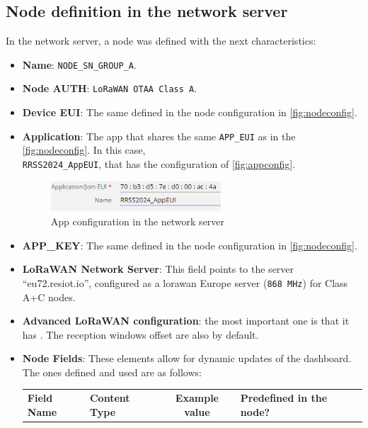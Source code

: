 \subsection{Node definition in the network server}

In the network server, a node was defined with the next characteristics:
\begin{itemize}
    \item \textbf{Name}: \texttt{NODE\_SN\_GROUP\_A}.
    \item \textbf{Node AUTH}: \texttt{LoRaWAN OTAA Class A}.
    \item \textbf{Device EUI}: The same defined in the node configuration in \autoref{fig:nodeconfig}.
    \item \textbf{Application}: The app that shares the same \texttt{APP\_EUI} as in the \autoref{fig:nodeconfig}. In this case, \\ \texttt{RRSS2024\_AppEUI}, that has the configuration of \autoref{fig:appconfig}.
    \begin{figure}[H]
        \centering
        \includegraphics[width=0.6\textwidth]{images/6/AppName.png}
        \caption{App configuration in the network server}
        \label{fig:appconfig}
    \end{figure}
    \item \textbf{APP\_KEY}: The same defined in the node configuration in \autoref{fig:nodeconfig}.
    \item \textbf{LoRaWAN Network Server}: This field points to the server ``eu72.resiot.io'', configured as a \acrshort{lorawan} Europe server (\texttt{868 MHz}) for Class A+C nodes.
    \item \textbf{Advanced LoRaWAN configuration}: the most important one is that it has . The reception windows offset are also by default.
    \item \textbf{Node Fields}: These elements allow for dynamic updates of the dashboard. The ones defined and used are as follows:
    \begin{table}[H]
        \begin{center}
            \begin{tabular}{|p{} | p{} |c| p{}| p{}|}
                \hline
                \textbf{Field Name} & \textbf{Content Type} & \textbf{Example value} & \textbf{Predefined in the node?}\\

\end{tabular}
\end{center}
\end{table}
\end{itemize}
